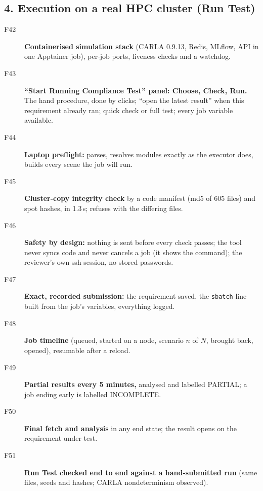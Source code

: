 \subsection*{4. Execution on a real HPC cluster (Run Test)}

\begin{description}
\item[F42] \textbf{Containerised simulation stack} (CARLA 0.9.13, Redis, MLflow, API in one Apptainer job), per-job ports, liveness checks and a watchdog. \taginfra
\item[F43] \textbf{``Start Running Compliance Test'' panel: Choose, Check, Run.} The hand procedure, done by clicks; ``open the latest result'' when this requirement already ran; quick check or full test; every job variable available. \tagnew{} 
\item[F44] \textbf{Laptop preflight:} parses, resolves modules exactly as the executor does, builds every scene the job will run. \tagnew{} 
\item[F45] \textbf{Cluster-copy integrity check} by a code manifest (md5 of 605 files) and spot hashes, in 1.3\,s; refuses with the differing files. \tagnew{} 
\item[F46] \textbf{Safety by design:} nothing is sent before every check passes; the tool never syncs code and never cancels a job (it shows the command); the reviewer's own ssh session, no stored passwords. \taginfra
\item[F47] \textbf{Exact, recorded submission:} the requirement saved, the \texttt{sbatch} line built from the job's variables, everything logged. \taginfra
\item[F48] \textbf{Job timeline} (queued, started on a node, scenario $n$ of $N$, brought back, opened), resumable after a reload. \tagnew{}
\item[F49] \textbf{Partial results every 5 minutes,} analysed and labelled PARTIAL; a job ending early is labelled INCOMPLETE. \tagnew{}
\item[F50] \textbf{Final fetch and analysis} in any end state; the result opens on the requirement under test. \taginfra
\item[F51] \textbf{Run Test checked end to end against a hand-submitted run} (same files, seeds and hashes; CARLA nondeterminism observed). \taginfra {}
\end{description}

